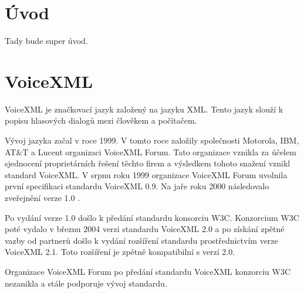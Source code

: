\documentclass[ing,male,java,dept460]{diploma}						%
\begin{document}
\MakeTitlePages

\tableofcontents
\cleardoublepage	%

\listoftables
\cleardoublepage	%

\listoffigures
\cleardoublepage	%


\lstlistoflistings
\cleardoublepage	%



\section{Úvod}
\label{sec:Uvod}
Tady bude super úvod.

\section{VoiceXML}
\label{sec:VoiceXML}
VoiceXML je značkovací jazyk založený na jazyku XML. Tento jazyk slouží k popisu hlasových dialogů mezi člověkem a počítačem.

Vývoj jazyka začal v roce 1999. V tomto roce založily společnosti Motorola, IBM, AT\&T a Lucent organizaci VoiceXML Forum. Tato organizace vznikla za účelem sjednocení proprietárních řešení těchto firem a výsledkem tohoto snažení vznikl standard VoiceXML. V srpnu roku 1999 organizace VoiceXML Forum uvolnila první specifikaci standardu VoiceXML 0.9. Na jaře roku 2000 následovalo zveřejnění verze 1.0 \cite{vxmldevguide}.

Po vydání verze 1.0 došlo k předání standardu konsorciu W3C. Konzorcium W3C poté vydalo v březnu 2004 verzi standardu VoiceXML 2.0 a po získání zpětné vazby od partnerů došlo k vydání rozšíření standardu prostřednictvím verze VoiceXML 2.1. Toto rozšíření je zpětně kompatibilní s verzí 2.0.

Organizace VoiceXML Forum po předání standardu VoiceXML konzorciu W3C nezanikla a stále podporuje vývoj standardu.
\end{document}
